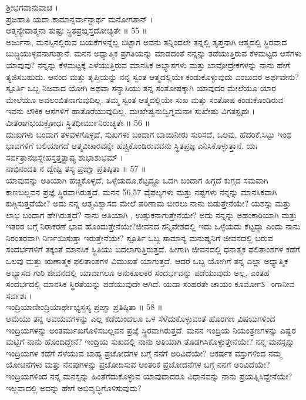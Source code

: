 ಶ್ರೀಭಗವಾನುವಾಚ ।\\
ಪ್ರಜಹಾತಿ ಯದಾ ಕಾಮಾನ್ಸರ್ವಾನ್ಪಾರ್ಥ ಮನೋಗತಾನ್ ।\\
ಆತ್ಮನ್ಯೇವಾತ್ಮನಾ ತುಷ್ಟಃ ಸ್ಥಿತಪ್ರಙ್ಞಸ್ತದೋಚ್ಯತೇ ॥ 55 ॥\\
 ಅರ್ಜುನಾ, ಮನಸ್ಸಿನಲ್ಲಿರುವ ಬಯಕೆಗಳನ್ನೆಲ್ಲ ಬಿಟ್ಟಾಗ ಅವನು ತನ್ನಿಂದಲೇ ತನ್ನಲ್ಲಿ ತೃಪ್ತನಾಗಿ ಆತ್ಮದಲ್ಲಿ ಸ್ಥಿರವಾದ ಬುದ್ಧಿಯುಳ್ಳವನಾಗುತ್ತಾನೆ.
ಮನನ 
 ಅಧ್ಯಾತ್ಮಿಕ ಪ್ರಗತಿಯನ್ನು ಮಾಡದಂತೆ ನನ್ನನ್ನು ತಡೆಯುತ್ತಿರುವ ಕೆಳಮಟ್ಟದ ಆಸೆಗಳು ಯಾವುವು? ನನ್ನನ್ನು ಕೆಳಮಟ್ಟಕ್ಕೆ ಎಳೆಯುತ್ತಿರುವ ಮಾನಸಿಕ ಅಭ್ಯಾಸಗಳು ಮತ್ತು ಬಾವೋದ್ರೇಕಗಳನ್ನು   ನಾನು ಹೇಗೆ ತ್ಯಜಿಸಬಹುದು. ಆನಂದ ಮತ್ತು ತೃಪ್ತಿಯನ್ನು ನನ್ನ ಸ್ವಂತ ಆತ್ಮದಲ್ಲಿಯೇ ಕಂಡುಕೊಳ್ಳುವುದು ಎಂಬುದರ ಅರ್ಥವೇನು?
 ಸ್ಪೂರ್ತಿ 
 ಒಬ್ಬ ನಿಜವಾದ ಯೋಗಿ ಅಥವಾ ಸನ್ಯಾಸಿಯು ತನ್ನ ಸಂತೋಷಕ್ಕಾಗಿ ಯಾವುದರ ಮೇಲೆಯೂ ಯಾರ ಮೇಲೆಯೂ ಅವಲಂಬಿತನಾಗುವುದಿಲ್ಲ. ತಮ್ಮ ಸ್ವಂತ ಆತ್ಮದಲ್ಲಿಯೇ ಸುಖ ಮತ್ತು ಸಂತೋಷ ಕಂಡುಕೊಂಡಿರುವ ಇವನು ಲೌಕಿಕ ಆಸೆಗಳಿಗೆ ಹಾತೊರೆಯುವುದಿಲ್ಲ.
ದುಃಖೇಷ್ವನುದ್ವಿಗ್ನಮನಾಃ ಸುಖೇಷು ವಿಗತಸ್ಪೃಹಃ ।\\
ವೀತರಾಗಭಯಕ್ರೋಧಃ ಸ್ಥಿತಧೀರ್ಮುನಿರುಚ್ಯತೇ ॥ 56 ॥\\
 ದುಃಖಗಳು ಬಂದಾಗ ತಳವಳಗೊಳ್ಳದೆ, ಸುಖಗಳು ಬಂದಾಗ ಬಾಯಿನೀರು ಸುರಿಸದೆ, ಒಲವು, ಹೆದರಿಕೆ,ಸಿಟ್ಟು ಇಂಥ ಭಾವಗಳಿಗೆ ಬಲಿಯಾಗದೆ ಆತ್ಮವಿಚಾರವನ್ನೇ ಹಚ್ಚಿಕೊಂಡಿರುವವನು ಸ್ಥಿತಪ್ರಜ್ಞ ಎನಿಸಿಕೊಳ್ಳುತ್ತಾನೆ.
ಯಃ ಸರ್ವತ್ರಾನಭಿಸ್ನೇಹಸ್ತತ್ತತ್ಪ್ರಾಪ್ಯ ಶುಭಾಶುಭಮ್ ।\\
ನಾಭಿನಂದತಿ ನ ದ್ವೇಷ್ಟಿ ತಸ್ಯ ಪ್ರಙ್ಞಾ ಪ್ರತಿಷ್ಠಿತಾ ॥ 57 ॥\\
 ಯಾವುದನ್ನು ಅತಿಯಾಗಿ ಹಚ್ಚಿಕೊಳ್ಳದೆ, ಒಳ್ಳೆಯದೂ,ಕೆಟ್ಟದ್ದೂ ಒದಗಿ ಬಂದಾಗ ಹಿಗ್ಗದೆ ಕುಗ್ಗದ ಸಮವಾಗಿ ಕಾಣಬಲ್ಲವನ ಪ್ರಜ್ಞೆ ಸ್ಥಿರವಾಗಿರುತ್ತದೆ.
ಮನನ 56,57
 ವೈಫಲ್ಯಗಳು ಮತ್ತು ನಷ್ಟಗಳು ನನ್ನನ್ನು ಮಾನಸಿಕವಾಗಿ  ಕುಗ್ಗಿಸುತ್ತವೆಯೇ? ಅದು ನನ್ನ ಆತ್ಮವಿಶ್ವಾಸದ ಮೇಲೆ ಪರಿಣಾಮ ಬೀರಲು ನಾನು ಬಿಡುತ್ತೇನೆಯೇ? ಯಶಸ್ಸು ಮತ್ತು ಲಾಭ ಬಂದಾಗ ಹೇಗಿರುತ್ತದೆ? ನಾನು ಅತಿಯಾಗಿ , ಉತ್ಸುಕನಾಗುತ್ತೇನೆಯೇ? ಅದು ನನ್ನನ್ನು ಅಹಂಕಾರಿಯಾಗಿ ಮತ್ತು ಇತರರ ಬಗ್ಗೆ ನಿರಾಕರಣೆ ಭಾವ ಹೊಂದುತ್ತೇನೆಯೇ?ಜೀವನದ ಸನ್ನಿವೇಶದಲ್ಲಿ ಇದು ಒಳ್ಳೆಯದು ಕೆಟ್ಟದ್ದು ಎಂದು ನಾನು ನಿರಂತರವಾಗಿ ನಿರ್ಣಯಿಸುತ್ತಾ ಇರುತ್ತೇನೆಯೇ?
 ಸ್ಪೂರ್ತಿ 
 ಒಬ್ಬ ಸಾಮಾನ್ಯ ಮನುಷ್ಯನಿಗೆ ಜೀವನದಲ್ಲಿ ಬರುವ ಸಂದರ್ಭಗಳಿಗೆ ತಕ್ಕಂತೆ ಮಾನಸಿಕ ಸ್ಥಿತಿಯು ಬದಲಾಗುತ್ತಿರುತ್ತದೆ. ಹೀಗಾಗಿ ಜೀವನದಲ್ಲಿ ಧನಾತ್ಮಕ ಫಲಿತಾಂಶಗಳ ಕಡೆಗೆ ಒಲವು ಮತ್ತು ಋಣಾತ್ಮಕ ಫಲಿತಾಂಶಗಳ ವಿಮುಖತೆ ಯಾಗುತ್ತದೆ. ಆದರೆ ಒಬ್ಬ ಯೋಗಿಗೆ ತನ್ನ ಎಲ್ಲಾ ಅಧ್ಯಾತ್ಮಿಕ ಅಭ್ಯಾಸದ ಗುರಿ ಜೀವನದಲ್ಲಿ ಯಾವಾಗಲೂ ಅನುಕೂಲಕರ ಸಂದರ್ಭವನ್ನು ಪಡೆಯುವುದು ಅಲ್ಲ, ಎಂತಹ ಸಂದರ್ಭದಲ್ಲಿ ಮಾನಸಿಕ ಸ್ಥಿರತೆಯನ್ನು ಪಡೆಯುವುದೇ ಆಗಿದೆ.
ಯದಾ ಸಂಹರತೇ ಚಾಯಂ ಕೂರ್ಮೋऽಂಗಾನೀವ ಸರ್ವಶಃ ।\\
ಇಂದ್ರಿಯಾಣೀಂದ್ರಿಯಾರ್ಥೇಭ್ಯಸ್ತಸ್ಯ ಪ್ರಙ್ಞಾ ಪ್ರತಿಷ್ಠಿತಾ ॥ 58 ॥\\
 ಆಮೆಯು ತನ್ನ ಅವಯವಗಳನ್ನು ಎಲ್ಲ ಕಡೆಯಿಂದಲೂ ಒಳ ಸೆಳೆದುಕೊಳ್ಳುವಂತೆ ಹೊರಗಣ ವಿಷಯಗಳಿಂದ ಇಂದ್ರಿಯಗಳನ್ನು ಅಂತರ್ಮುಖಗೊಳಿಸಬಲ್ಲವನ ಪ್ರಜ್ಞೆ ಸ್ಥಿರವಾಗಿರುತ್ತದೆ.
ಮನನ 
 ಇಂದ್ರಿಯ ನಿಯಂತ್ರಣಗಳನ್ನು ಎಷ್ಟರ ಮಟ್ಟಿಗೆ ನಾನು ಹೊಂದಿದ್ದೇನೆ? ಇಂದ್ರಿಯ ಸುಖದಲ್ಲಿ ನಾನು ಅತಿಯಾಗಿ ತೊಡಗಿಸಿಕೊಳ್ಳುತ್ತೇನೆಯೇ? ನನ್ನ ಮನಸ್ಸನ್ನು ಇಂದ್ರಿಯಗಳ ಕಡೆಗೆ ಸೆಳೆಯುವ ಬಾಹ್ಯ ಪ್ರಚೋದಗಳ ಬಗ್ಗೆ ನನಗೆ ಅರಿವಿದೆಯೇ? ಆಕರ್ಷಕ ವಸ್ತುಗಳಿಂದ ನಮ್ಮ ಯೋಚನೆಗಳು ಮತ್ತು ನೆನಪುಗಳನ್ನು ಪ್ರಚೋದಿಸುವ ಆಂತರಿಕ ಪ್ರಚೋದನೆಗಳ ಬಗ್ಗೆ ನನಗೆ ಅರಿವಿದೆಯೇ? ಇಂದ್ರಿಯಗಳಿಂದ ನನ್ನ ಮನಸ್ಸನ್ನು ಹಿಂತೆಗೆದುಕೊಳ್ಳುವ ಯಾವುದಾದರೂ ವಿಧಾನವನ್ನು ನಾನು ಪ್ರಯತ್ನಿಸಿದ್ದೇನೆಯೇ? ಇಲ್ಲವಾದಲ್ಲಿ ಅದನ್ನು ಹೇಗೆ ಅಭಿವೃದ್ಧಿಗೊಳಿಸುವುದು?
